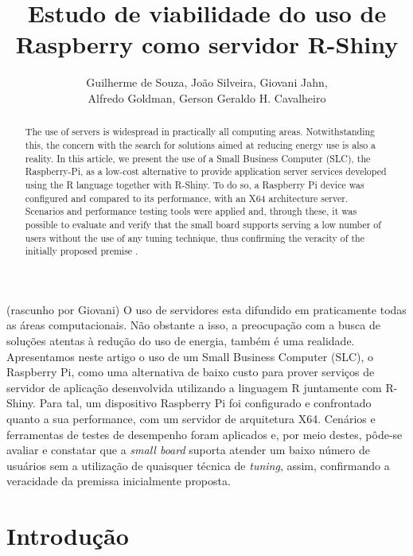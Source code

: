\documentclass[12pt,english,brazil]{article}
\title{Estudo de viabilidade do uso de Raspberry como servidor R-Shiny}
\author{Guilherme de Souza\inst{1}, João Silveira\inst{1}, Giovani Jahn\inst{1}, \\Alfredo Goldman\inst{2}, Gerson Geraldo H. Cavalheiro\inst{1}}
\begin{document}
 

\maketitle
    
\en
\begin{abstract}
The use of servers is widespread in practically all computing areas. Notwithstanding this, the concern with the search for solutions aimed at reducing energy use is also a reality. In this article, we present the use of a Small Business Computer (SLC), the Raspberry-Pi, as a low-cost alternative to provide application server services developed using the R language together with R-Shiny. To do so, a Raspberry Pi device was configured and compared to its performance, with an X64 architecture server. Scenarios and performance testing tools were applied and, through these, it was possible to evaluate and verify that the small board supports serving a low number of users without the use of any tuning technique, thus confirming the veracity of the initially proposed premise .

\end{abstract}

\br
\begin{resumo} (rascunho por Giovani)
O uso de servidores esta difundido em praticamente todas as áreas computacionais. Não obstante a isso, a preocupação com a busca de soluções atentas à redução do uso de energia, também é uma realidade.  Apresentamos neste artigo o uso de um Small Business Computer (SLC), o Raspberry Pi, como uma alternativa de baixo custo para prover serviços de servidor de aplicação desenvolvida utilizando a linguagem R juntamente com R-Shiny. Para tal, um dispositivo Raspberry Pi foi configurado e confrontado quanto a sua performance, com um servidor de arquitetura X64. Cenários e ferramentas de testes de desempenho foram aplicados e, por meio destes, pôde-se avaliar e constatar que a \emph{small board} suporta atender um baixo número de usuários sem a utilização de quaisquer técnica de \emph{tuning}, assim, confirmando a veracidade da premissa inicialmente proposta.


\end{resumo}



\section{Introdução}
\end{document}
